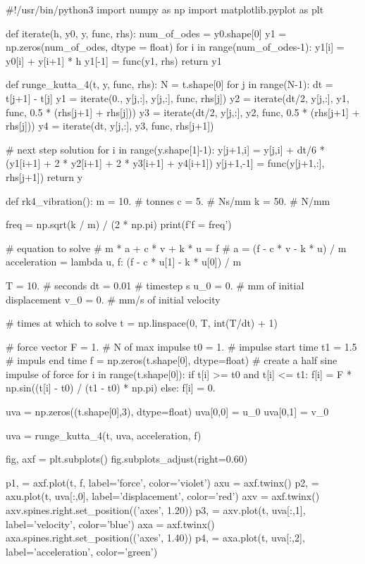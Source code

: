 \documentclass[10pt,b5paper,titlepage]{book}
\begin{document}
\begin{python}
#!/usr/bin/python3
import numpy as np
import matplotlib.pyplot as plt


def iterate(h, y0, y, func, rhs):
    num_of_odes = y0.shape[0]
    y1 = np.zeros(num_of_odes, dtype = float)
    for i in range(num_of_odes-1):
        y1[i] = y0[i] + y[i+1] * h
    y1[-1] = func(y1, rhs)
    return y1


def runge_kutta_4(t, y, func, rhs):
    N = t.shape[0]
    for j in range(N-1):
        dt = t[j+1] - t[j]
        y1 = iterate(0., y[j,:], y[j,:], func, rhs[j])
        y2 = iterate(dt/2, y[j,:], y1, func, 0.5 * (rhs[j+1] + rhs[j]))
        y3 = iterate(dt/2, y[j,:], y2, func, 0.5 * (rhs[j+1] + rhs[j]))
        y4 = iterate(dt, y[j,:], y3, func, rhs[j+1])

        # next step solution
        for i in range(y.shape[1]-1):
            y[j+1,i] = y[j,i] + dt/6 * (y1[i+1] + 2 * y2[i+1] + 2 * y3[i+1] + y4[i+1])
        y[j+1,-1] = func(y[j+1,:], rhs[j+1])
    return y


def rk4_vibration():
    m = 10.   # tonnes
    c = 5.    # Ns/mm
    k = 50.   # N/mm

    freq = np.sqrt(k / m) / (2 * np.pi)
    print(f'f = {freq}')

    # equation to solve
    # m * a + c * v + k * u = f
    # a = (f - c * v - k * u) / m
    acceleration = lambda u, f: (f - c * u[1] - k * u[0]) / m

    T = 10.     # seconds
    dt = 0.01   # timestep s
    u_0 = 0.    # mm of initial displacement
    v_0 = 0.    # mm/s of initial velocity

    # times at which to solve
    t = np.linspace(0, T, int(T/dt) + 1)

    # force vector
    F = 1.    # N of max impulse
    t0 = 1.   # impulse start time
    t1 = 1.5  # impuls end time
    f = np.zeros(t.shape[0], dtype=float)
    # create a half sine impulse of force
    for i in range(t.shape[0]):
        if t[i] >= t0 and t[i] <= t1:
            f[i] = F * np.sin((t[i] - t0) / (t1 - t0) * np.pi)
        else:
            f[i] = 0.

    uva = np.zeros((t.shape[0],3), dtype=float)
    uva[0,0] = u_0
    uva[0,1] = v_0

    uva = runge_kutta_4(t, uva, acceleration, f)

    fig, axf = plt.subplots()
    fig.subplots_adjust(right=0.60)

    p1, = axf.plot(t, f, label='force', color='violet')
    axu = axf.twinx()
    p2, = axu.plot(t, uva[:,0], label='displacement', color='red')
    axv = axf.twinx()
    axv.spines.right.set_position(('axes', 1.20))
    p3, = axv.plot(t, uva[:,1], label='velocity', color='blue')
    axa = axf.twinx()
    axa.spines.right.set_position(('axes', 1.40))
    p4, = axa.plot(t, uva[:,2], label='acceleration', color='green')


\end{python}
\end{document}
